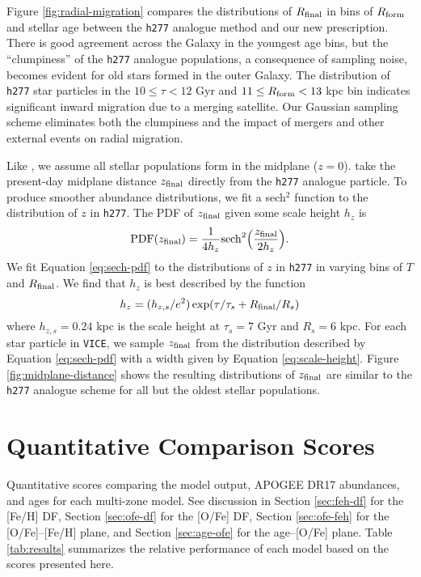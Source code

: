 \documentclass[twocolumn,twocolappendix]{aastex631}
\newcommand{\vice}{{\tt VICE}\xspace}
\newcommand{\hydro}{{\tt h277}\xspace}
\begin{document}
Figure \ref{fig:radial-migration} compares the distributions of $R_{\rm final}$ in bins of $R_{\rm form}$ and stellar age between the \hydro analogue method and our new prescription. There is good agreement across the Galaxy in the youngest age bins, but the ``clumpiness'' of the \hydro analogue populations, a consequence of sampling noise, becomes evident for old stars formed in the outer Galaxy. The distribution of \hydro star particles in the $10\leq\tau<12$ Gyr and $11\leq R_{\rm form}<13$ kpc bin indicates significant inward migration due to a merging satellite. Our Gaussian sampling scheme eliminates both the clumpiness and the impact of mergers and other external events on radial migration.

Like , we assume all stellar populations form in the midplane ($z=0$).  take the present-day midplane distance $z_{\rm final}$ directly from the \hydro analogue particle. To produce smoother abundance distributions, we fit a sech$^2$ function \citep{Spitzer1942} to the distribution of $z$ in \hydro. The PDF of $z_{\rm final}$ given some scale height $h_z$ is
\begin{equation}
    {\rm PDF}(z_{\rm final}) = \frac{1}{4 h_z} {\rm sech}^2\Big(\frac{z_{\rm final}}{2 h_z}\Big).
    \label{eq:sech-pdf}
\end{equation}
We fit Equation \ref{eq:sech-pdf} to the distributions of $z$ in \hydro in varying bins of $T$ and $R_{\rm final}$. We find that $h_z$ is best described by the function
\begin{equation}
    h_z = (h_{z,s}/e^2) \exp(\tau/\tau_s + R_{\rm final}/R_s)
    \label{eq:scale-height}
\end{equation}
where $h_{z,s}=0.24$ kpc is the scale height at $\tau_s=7$ Gyr and $R_s=6$ kpc.
For each star particle in \vice, we sample $z_{\rm final}$ from the distribution described by Equation \ref{eq:sech-pdf} with a width given by Equation \ref{eq:scale-height}. Figure \ref{fig:midplane-distance} shows the resulting distributions of $z_{\rm final}$ are similar to the \hydro analogue scheme for all but the oldest stellar populations.

\section{Quantitative Comparison Scores}
\label{app:quantitative-scores}

\begin{table*}
\centering
\caption{Quantitative scores comparing the model output,
APOGEE DR17 abundances, and  ages for each multi-zone
model. See discussion in Section \ref{sec:feh-df} for the [Fe/H] DF, 
Section \ref{sec:ofe-df} for the [O/Fe] DF, Section \ref{sec:ofe-feh} for the 
[O/Fe]--[Fe/H] plane, and Section \ref{sec:age-ofe} for the age--[O/Fe] 
plane. Table \ref{tab:results} summarizes the relative performance
of each model based on the scores presented here.}
\label{tab:scores}
\end{table*}
\end{document}
